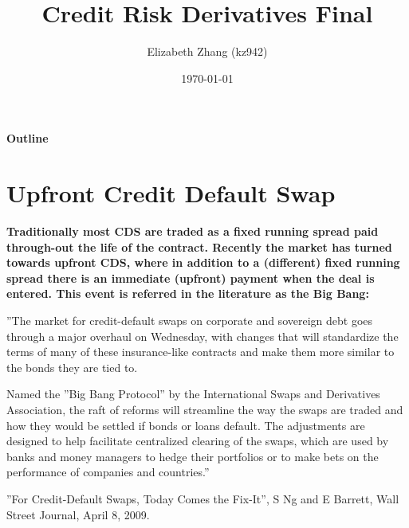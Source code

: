 \documentclass[11pt, notitlepage]{article}
\title{Credit Risk Derivatives Final}
\author{Elizabeth Zhang (kz942)}
\date{\today}
\def\\ln{\mathrm{\ln}}
\def\\exp{\mathrm{\exp}}
\def\\max{\mathrm{\max}}
\begin{document}
\maketitle
{\centering
  \textbf {Outline}\par
}
\begin{table}[H]
\centering
{}
\end{table}
\newpage
\color{red}
\section{Upfront Credit Default Swap}
\color{black}
\bfseries
Traditionally most CDS are traded as a fixed running spread paid through-out the life of the contract. Recently the market has turned towards upfront CDS, where in addition to a (different) fixed running spread there is an immediate (upfront) payment when the deal is entered. This event is referred in the literature as the Big Bang:

”The market for credit-default swaps on corporate and sovereign debt goes through a major overhaul on Wednesday, with changes that will standardize the terms of many of these insurance-like contracts and make them more similar to the bonds they are tied to.

Named the ”Big Bang Protocol” by the International Swaps and Derivatives Association, the raft of reforms will streamline the way the swaps are traded and how they would be settled if bonds or loans default. The adjustments are designed to help facilitate centralized clearing of the swaps, which are used by banks and money managers to hedge their portfolios or to make bets on the performance of companies and countries.”

”For Credit-Default Swaps, Today Comes the Fix-It”, S Ng and E Barrett, Wall Street Journal, April 8, 2009.
\end{document}
